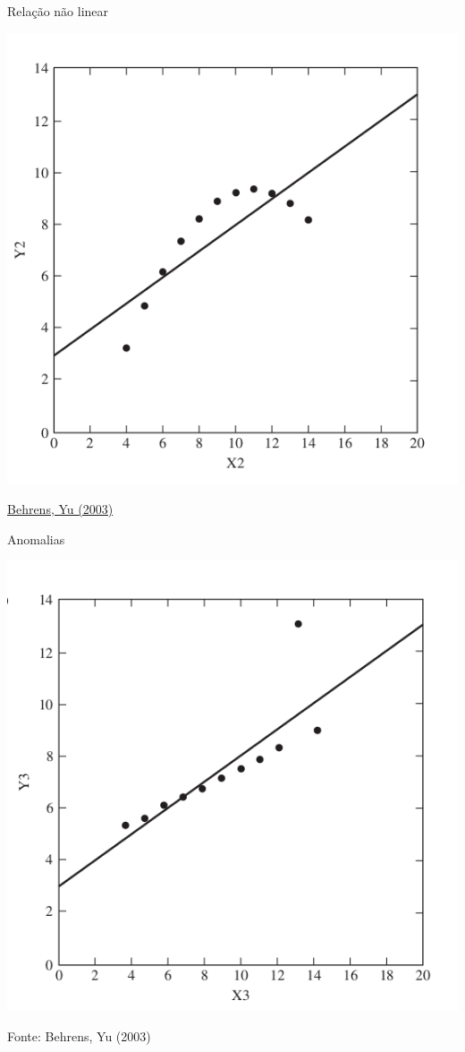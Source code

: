 \documentclass{beamer}
\begin{document}
\begin{frame}{Relação não linear}
  \begin{center}
    \includegraphics[height=0.7\textheight]{EDA/eda-dispersao2}
  \end{center}

  \vfill
  \scriptsize
  \hfill \href{https://doi.org/10.1002/0471264385.wei0202}
  {Behrens, Yu (2003)}
\end{frame}

\begin{frame}{Anomalias}
  \begin{center}
    \includegraphics[height=0.7\textheight]{EDA/eda-dispersao3}
  \end{center}

  \vfill
  \scriptsize
  \hfill Fonte: Behrens, Yu (2003)
\end{frame}
\end{document}
